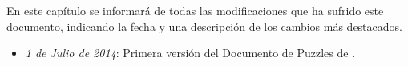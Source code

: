 En este capítulo se informará de todas las modificaciones que ha sufrido este documento, indicando la fecha y una descripción de los cambios más destacados.

\begin{itemize}
	\item \emph{1 de Julio de 2014}: Primera versión del Documento de Puzzles de \nombrejuego.
\end{itemize}